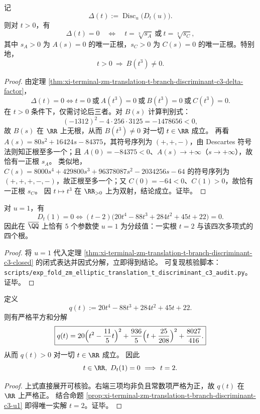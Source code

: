 \begin{corollary}[正实参数半轴上的分歧碰撞仅发生于两处]\label{cor:xi-terminal-zm-translation-t-branch-discriminant-c3-real-collision}
记
\[
\Delta(t):=\operatorname{Disc}_u\!\bigl(D_t(u)\bigr).
\]
则对 \(t>0\)，有
\[
\Delta(t)=0
\quad\Longleftrightarrow\quad
t=\sqrt[3]{s_A}\ \text{或}\ t=\sqrt[3]{s_C},
\]
其中 \(s_A>0\) 为 \(A(s)=0\) 的唯一正根，\(s_C>0\) 为 \(C(s)=0\) 的唯一正根。特别地，
\[
t>0\ \Longrightarrow\ B(t^3)\neq 0.
\]
\end{corollary}
\begin{proof}
由定理 \ref{thm:xi-terminal-zm-translation-t-branch-discriminant-c3-delta-factor}，
\[
\Delta(t)=0
\iff
t=0\ \text{或}\ A(t^3)=0\ \text{或}\ B(t^3)=0\ \text{或}\ C(t^3)=0.
\]
在 \(t>0\) 条件下，仅需讨论后三者。对 \(B(s)\) 计算判别式：
\[
(-1312)^2-4\cdot 256\cdot 3125=-1478656<0,
\]
故 \(B(s)\) 在 \(\RR\) 上无根，从而 \(B(t^3)\neq 0\) 对一切 \(t\in\RR\) 成立。
再看 \(A(s)=80s^2+16424s-84375\)，其符号序列为 \((+,+,-)\)，由 Descartes 符号法则知正根至多一个；且 \(A(0)=-84375<0\)、\(A(s)\to+\infty\)（\(s\to+\infty\)），故恰有一正根 \(s_A\)。
类似地，\(C(s)=8000s^4+429800s^3+96378087s^2-2034256s-64\) 的符号序列为 \((+,+,+,-,-)\)，故正根至多一个；又 \(C(0)=-64<0\)、\(C(1)>0\)，故恰有一正根 \(s_C\)。
因 \(t\mapsto t^3\) 在 \(\RR_{>0}\) 上为双射，结论成立。证毕。
\end{proof}

\begin{proposition}[\texorpdfstring{$u=1$}{u=1} 进入分歧值的完整代数条件]\label{prop:xi-terminal-zm-translation-t-branch-discriminant-c3-u1}
对 \(u=1\)，有
\[
\boxed{
D_t(1)=0\iff (t-2)\bigl(20t^4-88t^3+284t^2+45t+22\bigr)=0.}
\]
因此在 \(\overline{\QQ}\) 上恰有 \(5\) 个参数使 \(u=1\) 为分歧值：一实根 \(t=2\) 与该四次多项式的四个根。
\end{proposition}
\begin{proof}
将 \(u=1\) 代入定理 \ref{thm:xi-terminal-zm-translation-t-branch-discriminant-c3-closed} 的闭式表达并因式分解，立即得到结论。
可复现核验脚本：\texttt{scripts/exp\_fold\_zm\_elliptic\_translation\_t\_discriminant\_c3\_audit.py}。证毕。
\end{proof}

\begin{theorem}[四次因子的严格正性与唯一实 \texorpdfstring{$u=1$}{u=1} 共振]\label{thm:xi-terminal-zm-translation-t-branch-discriminant-c3-u1-positivity}
定义
\[
q(t):=20t^4-88t^3+284t^2+45t+22.
\]
则有严格平方和分解
\[
\boxed{
q(t)=20\Bigl(t^2-\frac{11}{5}t\Bigr)^2+\frac{936}{5}\Bigl(t+\frac{25}{208}\Bigr)^2+\frac{8027}{416}.}
\]
从而 \(q(t)>0\) 对一切 \(t\in\RR\) 成立。
因此
\[
t\in\RR,\ D_t(1)=0\ \Longrightarrow\ t=2.
\]
\end{theorem}
\begin{proof}
上式直接展开可核验。右端三项均非负且常数项严格为正，故 \(q(t)\) 在 \(\RR\) 上严格正。
结合命题 \ref{prop:xi-terminal-zm-translation-t-branch-discriminant-c3-u1} 即得唯一实解 \(t=2\)。证毕。
\end{proof}

